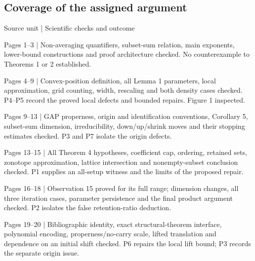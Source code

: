 \documentclass[10pt]{article}
\begin{document}
\subsection*{Coverage of the assigned argument}
Source unit | Scientific checks and outcome\par
Pages 1–3 | Non-averaging quantifiers, subset-sum relation, main exponents, lower-bound constructions and proof architecture checked. No counterexample to Theorems 1 or 2 established.\par
Pages 4–9 | Convex-position definition, all Lemma 1 parameters, local approximation, grid counting, width, rescaling and both density cases checked. P4–P5 record the proved local defects and bounded repairs. Figure 1 inspected.\par
Pages 9–13 | GAP properness, origin and identification conventions, Corollary 5, subset-sum dimension, irreducibility, down/up/shrink moves and their stopping estimates checked. P3 and P7 isolate the origin defects.\par
Pages 13–15 | All Theorem 4 hypotheses, coefficient cap, ordering, retained sets, zonotope approximation, lattice intersection and nonempty-subset conclusion checked. P1 supplies an all-setup witness and the limits of the proposed repair.\par
Pages 16–18 | Observation 15 proved for its full range; dimension changes, all three iteration cases, parameter persistence and the final product argument checked. P2 isolates the false retention-ratio deduction.\par
Pages 19–20 | Bibliographic identity, exact structural-theorem interface, polynomial encoding, properness/no-carry scale, lifted translation and dependence on an initial shift checked. P6 repairs the local lift bound; P3 records the separate origin issue.\par
\end{document}
